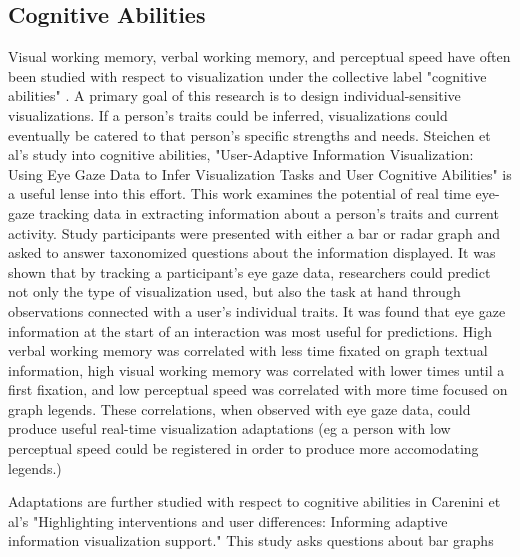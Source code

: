 \documentclass[conference]{IEEEtran}
\begin{document}
\subsection{Cognitive Abilities}
Visual working memory, verbal working memory, and perceptual speed have often
been studied with respect to visualization under the collective label
"cognitive abilities" \cite{UserAdaptive, HighlightingInterventions, ConatiLayouts}.
A primary goal of this research is to design individual-sensitive
visualizations. If a person's traits could be inferred, visualizations could
eventually be catered to that person's specific strengths and needs. Steichen
et al's study into cognitive abilities, "User-Adaptive Information Visualization:
Using Eye Gaze Data to Infer Visualization Tasks and User Cognitive Abilities"
is a useful lense into this effort\cite{UserAdaptive}. This work examines the
potential of real time eye-gaze tracking data in extracting information about
a person's traits and current activity. Study participants were presented
with either a bar or radar graph and asked to answer taxonomized questions
about the information displayed. It was shown that by tracking a participant's
eye gaze data, researchers could predict not only the type of visualization
used, but also the task at hand through observations connected with a user's
individual traits. It was found that eye gaze information at the start of an
interaction was most useful for predictions. High verbal working memory
was correlated with less time fixated on graph textual information, high
visual working memory was correlated with lower times until a first fixation,
and low perceptual speed was correlated with more time focused on graph legends.
These correlations, when observed with eye gaze data, could produce useful
real-time visualization adaptations (eg a person with low perceptual speed
could be registered in order to produce more accomodating legends.)

Adaptations are further studied with respect to cognitive abilities in
Carenini et al's "Highlighting interventions and user differences:
Informing adaptive information visualization support." This study
asks questions about bar graphs

\end{document}
